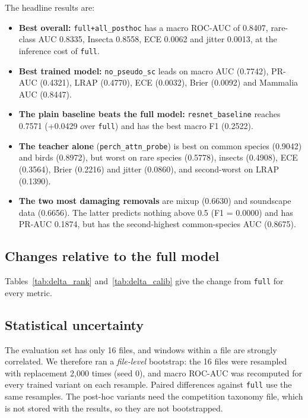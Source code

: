 \documentclass[11pt]{article}
\newcommand{\var}[1]{\texttt{#1}}
\begin{document}
The headline results are:
\begin{itemize}
  \item \textbf{Best overall:} \var{full+all\_posthoc} has a macro ROC-AUC of
        0.8407, rare-class AUC 0.8335, Insecta 0.8558, ECE 0.0062 and jitter
        0.0013, at the inference cost of \var{full}.
  \item \textbf{Best trained model:} \var{no\_pseudo\_sc} leads on macro AUC
        (0.7742), PR-AUC (0.4321), LRAP (0.4770), ECE (0.0032), Brier
        (0.0092) and Mammalia AUC (0.8447).
  \item \textbf{The plain baseline beats the full model:}
        \var{resnet\_baseline} reaches 0.7571 (+0.0429 over \var{full}) and
        has the best macro F1 (0.2522).
  \item \textbf{The teacher alone} (\var{perch\_attn\_probe}) is best on
        common species (0.9042) and birds (0.8972), but worst on rare species
        (0.5778), insects (0.4908), ECE (0.3564), Brier (0.2216) and jitter
        (0.0860), and second-worst on LRAP (0.1390).
  \item \textbf{The two most damaging removals} are mixup (0.6630) and
        soundscape data (0.6656). The latter predicts nothing above 0.5
        (F1 = 0.0000) and has PR-AUC 0.1874, but has the second-highest
        common-species AUC (0.8675).
\end{itemize}

\subsection{Changes relative to the full model}
Tables~\ref{tab:delta_rank} and~\ref{tab:delta_calib} give the change from
\var{full} for every metric.




\subsection{Statistical uncertainty}
\label{sec:boot}
The evaluation set has only 16 files, and windows within a file are strongly
correlated. We therefore ran a \emph{file-level} bootstrap: the 16 files were
resampled with replacement 2{,}000 times (seed 0), and macro ROC-AUC was
recomputed for every trained variant on each resample. Paired differences
against \var{full} use the same resamples. The post-hoc variants need the
competition taxonomy file, which is not stored with the results, so they are
not bootstrapped.
\end{document}
